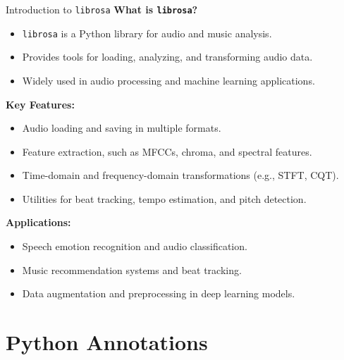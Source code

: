 \documentclass[10pt]{beamer}
\let\olditem\item
\renewcommand\item{\olditem\justifying}
\begin{document}
	
	\begin{frame}{Introduction to \texttt{librosa}}
		\textbf{What is \texttt{librosa}?}
		\begin{itemize}
			\item \texttt{librosa} is a Python library for audio and music analysis.
			\item Provides tools for loading, analyzing, and transforming audio data.
			\item Widely used in audio processing and machine learning applications.
		\end{itemize}
		
		\textbf{Key Features:}
		\begin{itemize}
			\item Audio loading and saving in multiple formats.
			\item Feature extraction, such as MFCCs, chroma, and spectral features.
			\item Time-domain and frequency-domain transformations (e.g., STFT, CQT).
			\item Utilities for beat tracking, tempo estimation, and pitch detection.
		\end{itemize}
		
		\textbf{Applications:}
		\begin{itemize}
			\item Speech emotion recognition and audio classification.
			\item Music recommendation systems and beat tracking.
			\item Data augmentation and preprocessing in deep learning models.
		\end{itemize}
	\end{frame}
	
		
		

		
		
		
		\section{Python Annotations}
		
		
	
\end{document}
